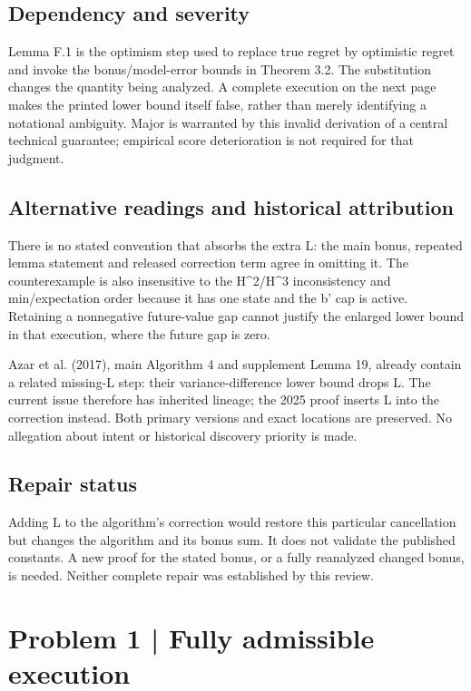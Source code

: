 \documentclass[10pt]{article}
\begin{document}
\subsection*{Dependency and severity}
Lemma F.1 is the optimism step used to replace true regret by optimistic regret and invoke the bonus/model-error bounds in Theorem 3.2. The substitution changes the quantity being analyzed. A complete execution on the next page makes the printed lower bound itself false, rather than merely identifying a notational ambiguity. Major is warranted by this invalid derivation of a central technical guarantee; empirical score deterioration is not required for that judgment.\par
\subsection*{Alternative readings and historical attribution}
There is no stated convention that absorbs the extra L: the main bonus, repeated lemma statement and released correction term agree in omitting it. The counterexample is also insensitive to the H\textasciicircum{}2/H\textasciicircum{}3 inconsistency and min/expectation order because it has one state and the b’ cap is active. Retaining a nonnegative future-value gap cannot justify the enlarged lower bound in that execution, where the future gap is zero.\par
Azar et al. (2017), main Algorithm 4 and supplement Lemma 19, already contain a related missing-L step: their variance-difference lower bound drops L. The current issue therefore has inherited lineage; the 2025 proof inserts L into the correction instead. Both primary versions and exact locations are preserved. No allegation about intent or historical discovery priority is made.\par
\subsection*{Repair status}
Adding L to the algorithm’s correction would restore this particular cancellation but changes the algorithm and its bonus sum. It does not validate the published constants. A new proof for the stated bonus, or a fully reanalyzed changed bonus, is needed. Neither complete repair was established by this review.\par
\section*{Problem 1 | Fully admissible execution}
\end{document}
